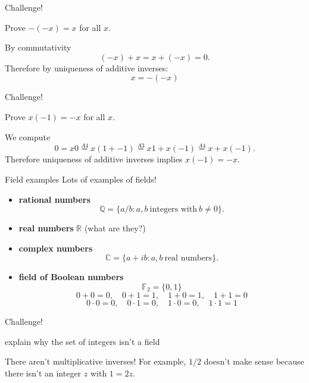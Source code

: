 \documentclass{beamer}
\begin{document}
\begin{frame}{Challenge!}
\begin{prob}
Prove $-(-x) = x$ for all $x$.
\end{prob}
\pause
\begin{soln}
\pause
By commutativity
$$(-x) + x = x + (-x) = 0.$$
\pause
Therefore by uniqueness of additive inverses:
$$x=-(-x)$$
\end{soln}
\end{frame}

\begin{frame}{Challenge!}
\begin{prob}
Prove $x(-1) = -x$ for all $x$.
\end{prob}
\pause
\begin{soln}
\pause
We compute
$$0 = x0 \stackrel{A4}{=} x(1 + -1) \stackrel{A3}{=} x1 + x(-1) \stackrel{A4} = x + x(-1).$$
\pause
Therefore uniqueness of additive inverses implies $x(-1)=-x$.
\end{soln}
\end{frame}

\begin{frame}{Field examples}
Lots of examples of fields!
\begin{itemize}
\pause
\item \textbf{rational numbers}
$$\mathbb{Q} = \{ a/b: a,b\ \text{integers with}\ b\neq 0\}.$$
\pause
\item \textbf{real numbers} $\mathbb{R}$ (what are they?)
\pause
\item \textbf{complex numbers}
$$\mathbb{C} = \{ a + ib: a,b\ \text{real numbers}\}.$$
\pause
\item \textbf{field of Boolean numbers}
$$\mathbb{F}_2 = \{0,1\}$$
$$0+0 = 0,\quad 0+1 = 1,\quad 1+0 = 1,\quad 1+1 = 0$$
$$0\cdot 0 = 0,\quad 0\cdot1 = 0,\quad 1\cdot0 = 0,\quad 1\cdot1 = 1$$
\end{itemize}
\end{frame}

\begin{frame}{Challenge!}
\begin{prob}
explain why the set of integers isn't a field
\end{prob}
\pause
\begin{soln}
There aren't multiplicative inverses!
\pause
For example, $1/2$ doesn't make sense because there isn't an integer $z$ with $1=2z$.
\end{soln}
\end{frame}
\end{document}
